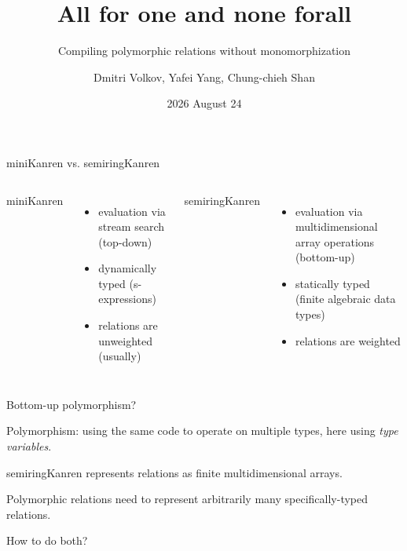 \documentclass{beamer}
\title{All for one and none forall}
\subtitle{Compiling polymorphic relations without monomorphization}
\author{Dmitri Volkov, Yafei Yang, Chung-chieh Shan}
\date{2026 August 24}
\begin{document}
\section{}

\begin{frame}[plain]
	\titlepage
\end{frame}

\begin{frame}
	\tableofcontents
\end{frame}

\begin{frame}{miniKanren vs. semiringKanren}

	\begin{columns}
		miniKanren
		\begin{itemize}
			\item evaluation via stream search (top-down)
			\item dynamically typed (s-expressions)
			\item relations are unweighted (usually)
		\end{itemize}

		semiringKanren
		\begin{itemize}
			\item evaluation via multidimensional array operations (bottom-up)
			\item statically typed (finite algebraic data types)
			\item relations are weighted
		\end{itemize}

	\end{columns}

\end{frame}

\begin{frame}{Bottom-up polymorphism?}

	Polymorphism: using the same code to operate on multiple types, here using \emph{type variables}.

	\vspace{1ex}

	\pause
	
	semiringKanren represents relations as finite multidimensional arrays.\\

	\vspace{1ex}

	Polymorphic relations need to represent arbitrarily many specifically-typed relations.\\

	\vspace{1ex}

	\pause

	How to do both?\\

\end{frame}
\end{document}
